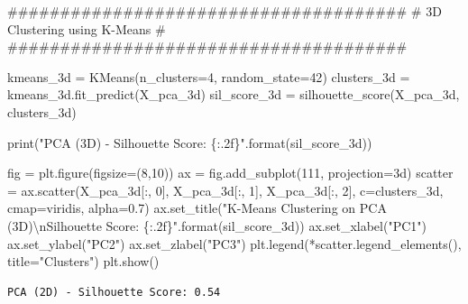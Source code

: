 \documentclass[
  letterpaper,
  DIV=11,
  numbers=noendperiod]{scrartcl}
\newenvironment{Shaded}{\begin{snugshade}}{\end{snugshade}}
\newcommand{\BuiltInTok}[1]{\textcolor[rgb]{0.00,0.23,0.31}{#1}}
\newcommand{\CharTok}[1]{\textcolor[rgb]{0.13,0.47,0.30}{#1}}
\newcommand{\CommentTok}[1]{\textcolor[rgb]{0.37,0.37,0.37}{#1}}
\newcommand{\DecValTok}[1]{\textcolor[rgb]{0.68,0.00,0.00}{#1}}
\newcommand{\FloatTok}[1]{\textcolor[rgb]{0.68,0.00,0.00}{#1}}
\newcommand{\NormalTok}[1]{\textcolor[rgb]{0.00,0.23,0.31}{#1}}
\newcommand{\OperatorTok}[1]{\textcolor[rgb]{0.37,0.37,0.37}{#1}}
\newcommand{\SpecialCharTok}[1]{\textcolor[rgb]{0.37,0.37,0.37}{#1}}
\newcommand{\StringTok}[1]{\textcolor[rgb]{0.13,0.47,0.30}{#1}}
\begin{document}
\begin{Shaded}
\begin{Highlighting}[]
\CommentTok{\#\#\#\#\#\#\#\#\#\#\#\#\#\#\#\#\#\#\#\#\#\#\#\#\#\#\#\#\#\#\#\#\#\#\#\#\#\#}
\CommentTok{\#    3D Clustering using K{-}Means     \#}
\CommentTok{\#\#\#\#\#\#\#\#\#\#\#\#\#\#\#\#\#\#\#\#\#\#\#\#\#\#\#\#\#\#\#\#\#\#\#\#\#\#}

\NormalTok{kmeans\_3d }\OperatorTok{=}\NormalTok{ KMeans(n\_clusters}\OperatorTok{=}\DecValTok{4}\NormalTok{, random\_state}\OperatorTok{=}\DecValTok{42}\NormalTok{)}
\NormalTok{clusters\_3d }\OperatorTok{=}\NormalTok{ kmeans\_3d.fit\_predict(X\_pca\_3d)}
\NormalTok{sil\_score\_3d }\OperatorTok{=}\NormalTok{ silhouette\_score(X\_pca\_3d, clusters\_3d)}

\BuiltInTok{print}\NormalTok{(}\StringTok{"PCA (3D) {-} Silhouette Score: }\SpecialCharTok{\{:.2f\}}\StringTok{"}\NormalTok{.}\BuiltInTok{format}\NormalTok{(sil\_score\_3d))}

\NormalTok{fig }\OperatorTok{=}\NormalTok{ plt.figure(figsize}\OperatorTok{=}\NormalTok{(}\DecValTok{8}\NormalTok{,}\DecValTok{10}\NormalTok{))}
\NormalTok{ax }\OperatorTok{=}\NormalTok{ fig.add\_subplot(}\DecValTok{111}\NormalTok{, projection}\OperatorTok{=}\StringTok{\textquotesingle{}3d\textquotesingle{}}\NormalTok{)}
\NormalTok{scatter }\OperatorTok{=}\NormalTok{ ax.scatter(X\_pca\_3d[:, }\DecValTok{0}\NormalTok{], X\_pca\_3d[:, }\DecValTok{1}\NormalTok{], X\_pca\_3d[:, }\DecValTok{2}\NormalTok{], }
\NormalTok{                     c}\OperatorTok{=}\NormalTok{clusters\_3d, cmap}\OperatorTok{=}\StringTok{\textquotesingle{}viridis\textquotesingle{}}\NormalTok{, alpha}\OperatorTok{=}\FloatTok{0.7}\NormalTok{)}
\NormalTok{ax.set\_title(}\StringTok{"K{-}Means Clustering on PCA (3D)}\CharTok{\textbackslash{}n}\StringTok{Silhouette Score: }\SpecialCharTok{\{:.2f\}}\StringTok{"}\NormalTok{.}\BuiltInTok{format}\NormalTok{(sil\_score\_3d))}
\NormalTok{ax.set\_xlabel(}\StringTok{"PC1"}\NormalTok{)}
\NormalTok{ax.set\_ylabel(}\StringTok{"PC2"}\NormalTok{)}
\NormalTok{ax.set\_zlabel(}\StringTok{"PC3"}\NormalTok{)}
\NormalTok{plt.legend(}\OperatorTok{*}\NormalTok{scatter.legend\_elements(), title}\OperatorTok{=}\StringTok{"Clusters"}\NormalTok{)}
\NormalTok{plt.show()}
\end{Highlighting}
\end{Shaded}

\begin{verbatim}
PCA (2D) - Silhouette Score: 0.54
\end{verbatim}
\end{document}
